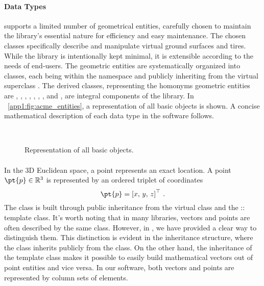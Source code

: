 \paragraph{Data Types}
\Acme{} supports a limited number of geometrical entities, carefully chosen to maintain the library's essential nature for efficiency and easy maintenance. The chosen classes specifically describe and manipulate virtual ground surfaces and tires. While the library is intentionally kept minimal, it is extensible according to the needs of end-users. The geometric entities are systematically organized into classes, each being within the \Acme{} namespace and publicly inheriting from the virtual superclass \Entity{}. The derived classes, representing the homonyms geometric entities are \Point{}, \Line{}, \Ray{}, \Plane{}, \Segment{}, \Triangle{}, \Disk{}, and \Ball{}, are integral components of the library. In \figurename{}~\ref{app1:fig:acme_entities}, a representation of all \Acme{} basic \Entity{} objects is shown. A concise mathematical description of each data type in the software follows.

\begin{figure*}[!ht]
  \centering
  \def\svgwidth{9cm}
   \\[1.0em]
  \def\svgwidth{9cm}
  
  \caption{Representation of all \Acme{} basic \Entity{} objects.}
  \label{app1:acme_entities}
\end{figure*}

\paragraph{\Point{}}
In the \ac{3D} Euclidean space, a point represents an exact location. A point $\pt{p} \in \mathbb{R}^3$ is represented by an ordered triplet of coordinates
%
\begin{equation*}
  \pt{p} = \left[x, \, y, \, z\right]^{\top} \, \text{.}
\end{equation*}
%
The \Point{} class is built through public inheritance from the virtual class \Entity{} and the \Eigen{}::\MatrixBase{} template class. It's worth noting that in many \cpp{} libraries, vectors and points are often described by the same class. However, in \Acme{}, we have provided a clear way to distinguish them. This distinction is evident in the inheritance structure, where the \Point{} class inherits publicly from the \Entity{} class. On the other hand, the inheritance of the \MatrixBase{} template class makes it possible to easily build mathematical vectors out of point entities and vice versa. In our software, both vectors and points are represented by column sets of elements.

